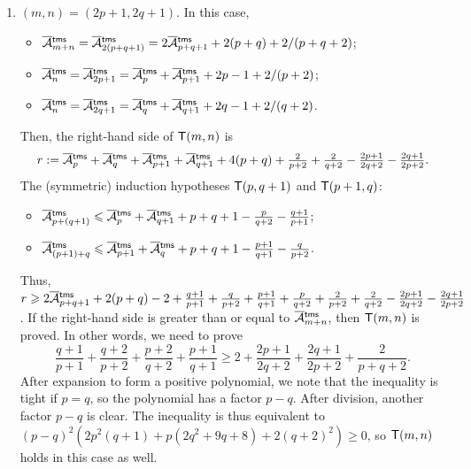 \begin{enumerate}
  \item \((m,n) = (2p+1,2q+1)\). In this case,
    \begin{itemize}

      \item \(\OM{\fun{tms}}{m+n} = \OM{\fun{tms}}{2(p+q+1)} =
        2\OM{\fun{tms}}{p+q+1} + 2(p+q) + 2/(p+q+2)\);

      \item \(\OM{\fun{tms}}{n} = \OM{\fun{tms}}{2p+1} =
        \OM{\fun{tms}}{p} + \OM{\fun{tms}}{p+1} + 2p - 1 + 2/(p+2)\);

      \item \(\OM{\fun{tms}}{n} = \OM{\fun{tms}}{2q+1} =
        \OM{\fun{tms}}{q} + \OM{\fun{tms}}{q+1} + 2q - 1 + 2/(q+2)\).

    \end{itemize}
    Then, the right\hyp{}hand side of \(\textsf{T}({m,n})\) is
    \begin{equation*}
      r := \OM{\fun{tms}}{p} + \OM{\fun{tms}}{q} + \OM{\fun{tms}}{p+1}
      + \OM{\fun{tms}}{q+1} + 4(p+q) + \tfrac{2}{p+2} + \tfrac{2}{q+2}
      - \tfrac{2p+1}{2q+2} - \tfrac{2q+1}{2p+2}.
    \end{equation*}
    The (symmetric) induction hypotheses \(\textsf{T}({p,q+1})\) and
    \(\textsf{T}({p+1,q})\):
    \begin{itemize}

      \item \(\OM{\fun{tms}}{p+(q+1)} \leqslant \OM{\fun{tms}}{p} +
        \OM{\fun{tms}}{q+1} + p + q + 1 - \tfrac{p}{q+2}
        - \tfrac{q+1}{p+1}\);

      \item \(\OM{\fun{tms}}{(p+1)+q} \leqslant \OM{\fun{tms}}{p+1} +
        \OM{\fun{tms}}{q} + p + q + 1 - \tfrac{p+1}{q+1} -
        \tfrac{q}{p+2}\).

    \end{itemize}
    Thus, \(r \geqslant 2\OM{\fun{tms}}{p+q+1} + 2(p+q) - 2 +
    \tfrac{q+1}{p+1} + \tfrac{q}{p+2} + \tfrac{p+1}{q+1} +
    \tfrac{p}{q+2} + \tfrac{2}{p+2} + \tfrac{2}{q+2} -
    \tfrac{2p+1}{2q+2} - \tfrac{2q+1}{2p+2}\). If the right\hyp{}hand
    side is greater than or equal to \(\OM{\fun{tms}}{m+n}\), then
    \(\textsf{T}({m,n})\) is proved. In other words, we need to prove
    \begin{equation*}
      \frac{q+1}{p+1} + \frac{q+2}{p+2} + \frac{p+2}{q+2} +
      \frac{p+1}{q+1} \geqslant 2 + \frac{2p+1}{2q+2} +
      \frac{2q+1}{2p+2} + \frac{2}{p+q+2}.
    \end{equation*}
    After expansion to form a positive polynomial, we note that the
    inequality is tight if \(p=q\), so the polynomial has a factor
    \(p-q\). After division, another factor \(p-q\) is clear. The
    inequality is thus equivalent to \((p-q)^2(2p^2(q+1) + p(2q^2 + 9q
    + 8) + 2(q+2)^2) \geqslant 0\), so \(\textsf{T}({m,n})\) holds in this
    case as well.

\end{enumerate}
